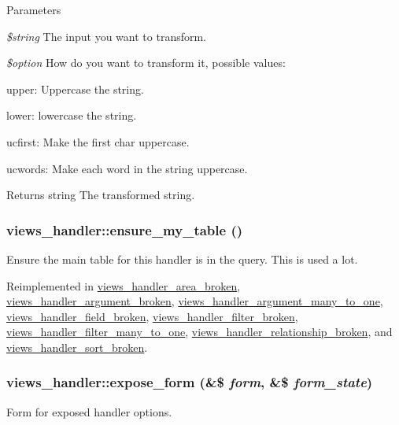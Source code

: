 \begin{DoxyParams}{Parameters}
\item[{\em \$string}]The input you want to transform. \item[{\em \$option}]How do you want to transform it, possible values:
\begin{DoxyItemize}
\item upper: Uppercase the string.
\item lower: lowercase the string.
\item ucfirst: Make the first char uppercase.
\item ucwords: Make each word in the string uppercase.
\end{DoxyItemize}\end{DoxyParams}
\begin{DoxyReturn}{Returns}
string The transformed string. 
\end{DoxyReturn}
\hypertarget{classviews__handler_a947f21ef0f21a77f4d103af4702b3600}{
\subsubsection[{ensure\_\-my\_\-table}]{\setlength{\rightskip}{0pt plus 5cm}views\_\-handler::ensure\_\-my\_\-table ()}}
\label{classviews__handler_a947f21ef0f21a77f4d103af4702b3600}
Ensure the main table for this handler is in the query. This is used a lot. 

Reimplemented in \hyperlink{classviews__handler__area__broken_acd6bec7fca60efb5ae6fa4f37a77a9f6}{views\_\-handler\_\-area\_\-broken}, \hyperlink{classviews__handler__argument__broken_a479772a6b1f448d4edf3ff3eef988733}{views\_\-handler\_\-argument\_\-broken}, \hyperlink{classviews__handler__argument__many__to__one_af6195d516010fbd9cda241fa450a748a}{views\_\-handler\_\-argument\_\-many\_\-to\_\-one}, \hyperlink{classviews__handler__field__broken_a887902026800149644e827fbb92dba15}{views\_\-handler\_\-field\_\-broken}, \hyperlink{classviews__handler__filter__broken_ae85934ec4cf9e01aba2b17ce58ead155}{views\_\-handler\_\-filter\_\-broken}, \hyperlink{classviews__handler__filter__many__to__one_a6ab5d3416cca7a6f5e59584071758673}{views\_\-handler\_\-filter\_\-many\_\-to\_\-one}, \hyperlink{classviews__handler__relationship__broken_acea2731924b5f5e3b83776f237b3ff67}{views\_\-handler\_\-relationship\_\-broken}, and \hyperlink{classviews__handler__sort__broken_a148e3b71f7327ed44a139ecefbd1d43b}{views\_\-handler\_\-sort\_\-broken}.\hypertarget{classviews__handler_af462ac68a6853bed2a537a7fb908d807}{
\subsubsection[{expose\_\-form}]{\setlength{\rightskip}{0pt plus 5cm}views\_\-handler::expose\_\-form (\&\$ {\em form}, \/  \&\$ {\em form\_\-state})}}
\label{classviews__handler_af462ac68a6853bed2a537a7fb908d807}
Form for exposed handler options. 

